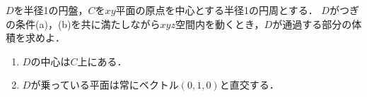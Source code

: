 \documentclass[../../main.tex]{subfiles}
\begin{document}
$D$を半径1の円盤，$C$を$xy$平面の原点を中心とする半径1の円周とする．
$D$がつぎの条件(a)，(b)を共に満たしながら$xyz$空間内を動くとき，$D$が通過する部分の体積を求めよ．
\begin{enumerate}
  \item[(a)] $D$の中心は$C$上にある．
  \item[(b)] $D$が乗っている平面は常にベクトル$(0,1,0)$と直交する．
\end{enumerate}
\end{document}
